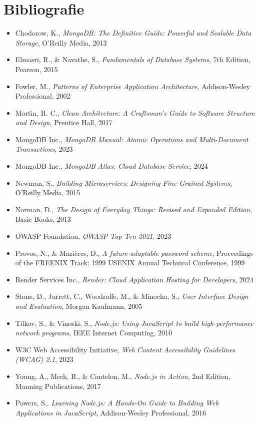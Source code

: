 \documentclass[12pt,a4paper]{report}
\begin{document}
\chapter{Bibliografie}
\begin{itemize}
    \item Chodorow, K., \textit{MongoDB: The Definitive Guide: Powerful and Scalable Data Storage}, O'Reilly Media, 2013
    \item Elmasri, R., \& Navathe, S., \textit{Fundamentals of Database Systems}, 7th Edition, Pearson, 2015
    \item Fowler, M., \textit{Patterns of Enterprise Application Architecture}, Addison-Wesley Professional, 2002
    \item Martin, R. C., \textit{Clean Architecture: A Craftsman's Guide to Software Structure and Design}, Prentice Hall, 2017
    \item MongoDB Inc., \textit{MongoDB Manual: Atomic Operations and Multi-Document Transactions}, 2023
    \item MongoDB Inc., \textit{MongoDB Atlas: Cloud Database Service}, 2024
    \item Newman, S., \textit{Building Microservices: Designing Fine-Grained Systems}, O'Reilly Media, 2015
    \item Norman, D., \textit{The Design of Everyday Things: Revised and Expanded Edition}, Basic Books, 2013
    \item OWASP Foundation, \textit{OWASP Top Ten 2021}, 2023
    \item Provos, N., \& Mazières, D., \textit{A future-adaptable password scheme}, Proceedings of the FREENIX Track: 1999 USENIX Annual Technical Conference, 1999
    \item Render Services Inc., \textit{Render: Cloud Application Hosting for Developers}, 2024
    \item Stone, D., Jarrett, C., Woodroffe, M., \& Minocha, S., \textit{User Interface Design and Evaluation}, Morgan Kaufmann, 2005
    \item Tilkov, S., \& Vinoski, S., \textit{Node.js: Using JavaScript to build high-performance network programs}, IEEE Internet Computing, 2010
    \item W3C Web Accessibility Initiative, \textit{Web Content Accessibility Guidelines (WCAG) 2.1}, 2023
    \item Young, A., Meck, B., \& Cantelon, M., \textit{Node.js in Action}, 2nd Edition, Manning Publications, 2017
    \item Powers, S., \textit{Learning Node.js: A Hands-On Guide to Building Web Applications in JavaScript}, Addison-Wesley Professional, 2016

\end{itemize}
\end{document}
